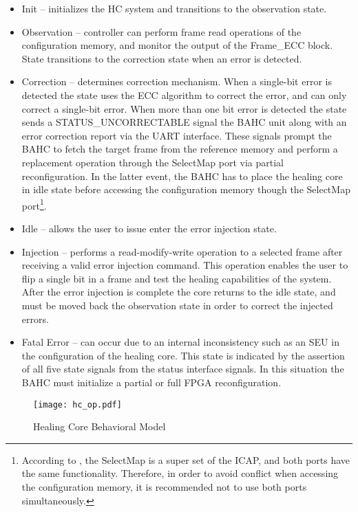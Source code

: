 \begin{itemize}
    \item Init -- initializes the HC system and transitions to the observation state.
    \item Observation -- controller can perform frame read operations of the configuration memory, and monitor the output of the Frame\_ECC block. State transitions to the correction state when an error is detected.
    \item Correction -- determines correction mechanism. When a single-bit error is detected the state uses the ECC algorithm to correct the error, and can only correct a single-bit error. When more than one bit error is detected the state sends a STATUS\_UNCORRECTABLE signal the BAHC unit along with an error correction report via the UART interface. These signals prompt the BAHC to fetch the target frame from the reference memory and perform a replacement operation through the SelectMap port via partial reconfiguration. In the latter event, the BAHC has to place the healing core in idle state before accessing the configuration memory though the SelectMap port\footnote{According to \cite{Configuration.Xilinx-15}, the SelectMap is a super set of the ICAP, and both ports have the same functionality. Therefore, in order to avoid conflict when accessing the configuration memory, it is recommended not to use both ports simultaneously.}.
    \item Idle -- allows the user to issue enter the error injection state. 
    \item Injection -- performs a read-modify-write operation to a selected frame after receiving a valid error injection command. This operation enables the user to flip a single bit in a frame and test the healing capabilities of the system. After the error injection is complete the core returns to the idle state, and must be moved back the observation state in order to correct the injected errors.
    \item Fatal Error -- can occur due to an internal inconsistency such as an SEU in the configuration of the healing core. This state is indicated by the assertion of all five state signals from the status interface signals. In this situation the BAHC must initialize a partial or full FPGA reconfiguration. 
\end{itemize}

\begin{figure}[!ht]
    \centering
        \texttt{[image: hc\_op.pdf]}
        \caption{Healing Core Behavioral Model \cite{SEM.Xilinx-15}}
    \label{fig:hcsd}
\end{figure}

